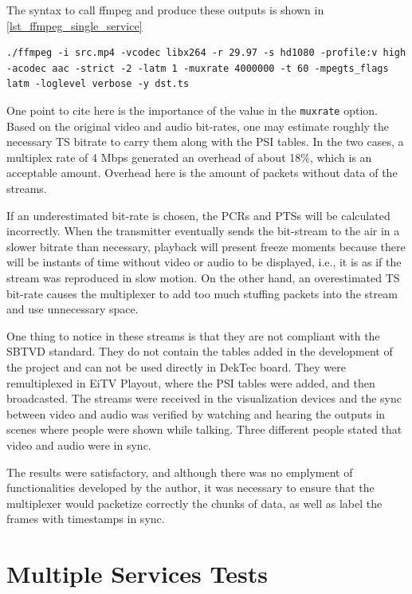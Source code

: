 \documentclass[
	12pt,				%
	openright,			%
	twoside,			%
	a4paper,			%
	brazil,
	french,				%
	english
	]{abntex2}
\begin{document}
The syntax to call ffmpeg and produce these outputs is shown in \autoref{lst_ffmpeg_single_service}

\begin{lstlisting}[caption={}, label={lst_ffmpeg_single_service}]
./ffmpeg -i src.mp4 -vcodec libx264 -r 29.97 -s hd1080 -profile:v high -acodec aac -strict -2 -latm 1 -muxrate 4000000 -t 60 -mpegts_flags latm -loglevel verbose -y dst.ts
\end{lstlisting}

One point to cite here is the importance of the value in the \texttt{muxrate} option. Based on the original video and audio bit-rates, one may estimate roughly the necessary TS bitrate to carry them along with the PSI tables. In the two cases, a multiplex rate of 4 Mbps generated an overhead of about 18\%, which is an acceptable amount. Overhead here is the amount of packets without data of the streams.

If an underestimated bit-rate is chosen, the PCRs and PTSs will be calculated incorrectly. When the transmitter eventually sends the bit-stream to the air in a slower bitrate than necessary, playback will present freeze moments because there will be instants of time without video or audio to be displayed, i.e., it is as if the stream was reproduced in slow motion. On the other hand, an overestimated TS bit-rate causes the multiplexer to add too much stuffing packets into the stream and use unnecessary space.

One thing to notice in these streams is that they are not compliant with the SBTVD standard. They do not contain the tables added in the development of the project and can not be used directly in DekTec board. They were remultiplexed in EiTV Playout, where the PSI tables were added, and then broadcasted. The streams were received in the visualization devices and the sync between video and audio was verified by watching and hearing the outputs in scenes where people were shown while talking. Three different people stated that video and audio were in sync.

The results were satisfactory, and although there was no emplyment of functionalities developed by the author, it was necessary to ensure that the multiplexer would packetize correctly the chunks of data, as well as label the frames with timestamps in sync.

\section{Multiple Services Tests}
\end{document}

